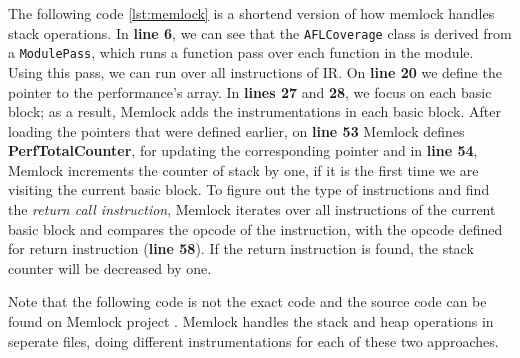 \UseRawInputEncoding

The following code \ref{lst:memlock} is a shortend version of how memlock handles stack operations. In \textbf{line 6}, we can see that the \texttt{AFLCoverage} class is derived from a \texttt{ModulePass}, which runs a function pass over each function in the module. Using this pass, we can run over all instructions of IR. On \textbf{line 20} we define the pointer to the performance's array. In \textbf{lines 27} and \textbf{28}, we focus on each basic block; as a result, Memlock adds the instrumentations in each basic block. After loading the pointers that were defined earlier, on \textbf{line 53} Memlock defines \textbf{PerfTotalCounter}, for updating the corresponding pointer and in \textbf{line 54}, Memlock increments the counter of stack by one, if it is the first time we are visiting the current basic block. To figure out the type of instructions and find the \textit{return call instruction}, Memlock iterates over all instructions of the current basic block and compares the opcode of the instruction, with the opcode defined for return instruction (\textbf{line 58}). If the return instruction is found, the stack counter will be decreased by one.

Note that the following code is not the exact code and the source code can be found on Memlock project \cite{wen2020memlock}. Memlock handles the stack and heap operations in seperate files, doing different instrumentations for each of these two approaches.

\vspace{5mm}

